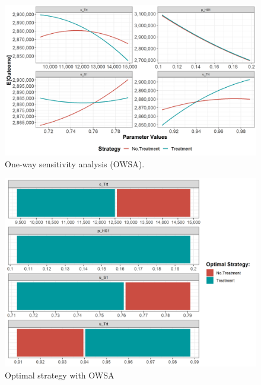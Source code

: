 \documentclass[]{book}
\begin{document}
\begin{figure}

{\centering \includegraphics[width=1\linewidth]{../figs/05a_owsa_lrm_nmb} 

}

\caption{One-way sensitivity analysis (OWSA).}\label{fig:05a-owsa-lrm-nmb}
\end{figure}

\begin{figure}

{\centering \includegraphics[width=1\linewidth]{../figs/05a_optimal_owsa_lrm_nmb} 

}

\caption{Optimal strategy with OWSA}\label{fig:05a-optimal-owsa-lrm-nmb}
\end{figure}
\end{document}
